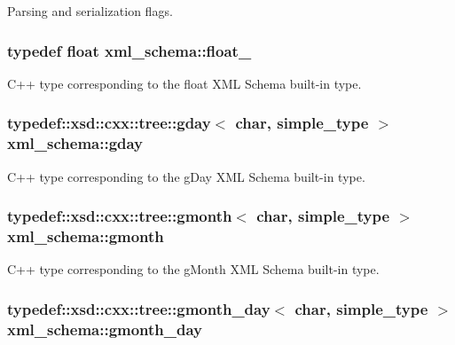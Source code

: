 Parsing and serialization flags. 

\hypertarget{namespacexml__schema_ad7e04ab17bba0b3fdde43fb79ef6ed87}{
\subsubsection[{float\-\_\-}]{\setlength{\rightskip}{0pt plus 5cm}typedef float {\bf xml\-\_\-schema\-::float\-\_\-}}}\label{namespacexml__schema_ad7e04ab17bba0b3fdde43fb79ef6ed87}


C++ type corresponding to the float X\-M\-L Schema built-\/in type. 

\hypertarget{namespacexml__schema_a80cbdd05209953df8c443ba8d81d4c25}{
\subsubsection[{gday}]{\setlength{\rightskip}{0pt plus 5cm}typedef\-::xsd\-::cxx\-::tree\-::gday$<$ char, {\bf simple\-\_\-type} $>$ {\bf xml\-\_\-schema\-::gday}}}\label{namespacexml__schema_a80cbdd05209953df8c443ba8d81d4c25}


C++ type corresponding to the g\-Day X\-M\-L Schema built-\/in type. 

\hypertarget{namespacexml__schema_afe97b9ae1d131c601ce16f8bb4cdc022}{
\subsubsection[{gmonth}]{\setlength{\rightskip}{0pt plus 5cm}typedef\-::xsd\-::cxx\-::tree\-::gmonth$<$ char, {\bf simple\-\_\-type} $>$ {\bf xml\-\_\-schema\-::gmonth}}}\label{namespacexml__schema_afe97b9ae1d131c601ce16f8bb4cdc022}


C++ type corresponding to the g\-Month X\-M\-L Schema built-\/in type. 

\hypertarget{namespacexml__schema_a61e87eff200c80a4fce76244d6d01296}{
\subsubsection[{gmonth\-\_\-day}]{\setlength{\rightskip}{0pt plus 5cm}typedef\-::xsd\-::cxx\-::tree\-::gmonth\-\_\-day$<$ char, {\bf simple\-\_\-type} $>$ {\bf xml\-\_\-schema\-::gmonth\-\_\-day}}}\label{namespacexml__schema_a61e87eff200c80a4fce76244d6d01296}


